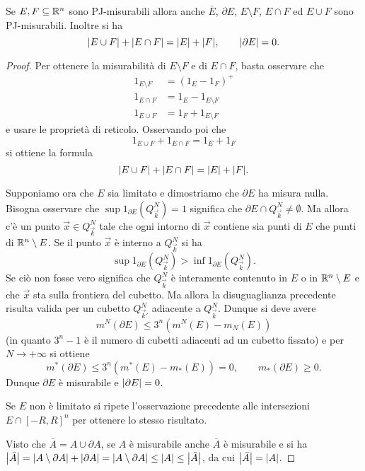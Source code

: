 \begin{theorem}
Se $E,F\subseteq {\mathbb R}^n$ sono PJ-misurabili allora anche $\bar E$, $\partial E$, 
$E\setminus F$, $E\cap F$ ed $E\cup F$ sono PJ-misurabili.
Inoltre si ha 
\[
    {\left|E\cup F\right|} + {\left|E\cap F\right|} = {\left|E\right|} + {\left|F\right|},
    \qquad
    {\left|\partial E\right|} = 0.
\]
\end{theorem}
\begin{proof}
Per ottenere la misurabilità di $E\setminus F$ e di $E\cap F$, basta osservare che 
\begin{align*}
  1_{E\setminus F} &= (1_E - 1_F)^+\\
  1_{E\cap F} &= 1_E - 1_{E\setminus F}\\
  1_{E\cup F} &= 1_F + 1_{E\setminus F}
\end{align*}
e usare le proprietà di reticolo.
Osservando poi che 
\[
  1_{E\cup F} + 1_{E\cap F} = 1_E + 1_F 
\]
si ottiene la formula
\[
  {\left|E\cup F\right|} + {\left|E\cap F\right|} = {\left|E\right|} + {\left|F\right|}.
\]

Supponiamo ora che $E$ sia limitato
e dimostriamo che $\partial E$ ha misura nulla.
Bisogna osservare 
che $\sup 1_{\partial E}(Q^N_{\vec k}) = 1$ 
significa che $\partial E\cap Q^N_{\vec k} \neq \emptyset$.
Ma allora c'è un punto $\vec x\in Q^N_{\vec k}$ tale che ogni intorno 
di $\vec x$ contiene sia punti di $E$ che punti di ${\mathbb R}^n\setminus E$.
Se il punto $\vec x$ è interno a $Q^N_{\vec k}$ si ha
\[
  \sup 1_{\partial E}(Q^N_{\vec k}) > \inf 1_{\partial E}(Q^N_{\vec k}).
\]
Se ciò non fosse vero significa che 
$Q^N_{\vec k}$ è interamente contenuto in $E$ o in ${\mathbb R}^n\setminus E$
e che $\vec x$ sta sulla frontiera del cubetto.
Ma allora la disuguaglianza precedente risulta valida 
per un cubetto $Q^N_{\vec k'}$ adiacente a $Q^N_{\vec k}$.
Dunque si deve avere 
\[
  m^N(\partial E)\le 3^n (m^N(E)-m_N(E))
\]
(in quanto $3^n-1$ è il numero di cubetti adiacenti ad un cubetto fissato)
e per $N\to +\infty$ si ottiene 
\[
  m^*(\partial E) \le 3^n (m^*(E)-m_*(E)) = 0, 
  \qquad 
  m_*(\partial E)\ge 0.
\]
Dunque $\partial E$ è misurabile e ${\left|\partial E\right|} = 0$.

Se $E$ non è limitato si ripete l'osservazione precedente alle intersezioni 
$E\cap [-R,R]^n$ per ottenere lo stesso risultato.

Visto che $\bar A = A \cup \partial A$, se $A$ è misurabile anche $\bar A$ è 
misurabile e si ha ${\left|\bar A\right|} = {\left|A\setminus \partial A\right|} + {\left|\partial A\right|}
= {\left|A \setminus \partial A\right|} \le {\left|A\right|} \le {\left|\bar A\right|}$,
da cui ${\left|\bar A\right|}={\left|A\right|}$.
\end{proof}


